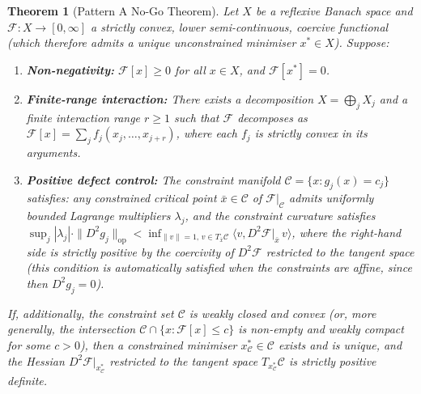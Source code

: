 \documentclass[12pt,a4paper]{article}
\newtheorem{theorem}{Theorem}[section]
\theoremstyle{definition}
\theoremstyle{remark}
\begin{document}
\begin{theorem}[Pattern A No-Go Theorem]\label{thm:no-go}
Let $X$ be a reflexive Banach space and $\mathcal{F} \colon X \to [0,\infty]$ a strictly convex, lower semi-continuous, coercive functional \textup{(}which therefore admits a unique unconstrained minimiser $x^* \in X$\textup{)}. Suppose:
\begin{enumerate}[label=\textup{(\roman*)}]
  \item \textbf{Non-negativity:}
    $\mathcal{F}[x] \ge 0$ for all $x \in X$, and $\mathcal{F}[x^*] = 0$.
  \item \textbf{Finite-range interaction:} There exists a decomposition
    $X = \bigoplus_{j} X_j$ and a finite interaction range $r \ge 1$ such that $\mathcal{F}$ decomposes as
    $\mathcal{F}[x] = \sum_j f_j(x_j, \ldots, x_{j+r})$, where each $f_j$ is strictly convex in its arguments.
  \item \textbf{Positive defect control:} The constraint manifold
    $\mathcal{C} = \{x : g_j(x) = c_j\}$ satisfies:
    any constrained critical point $\bar{x} \in \mathcal{C}$ of $\mathcal{F}|_{\mathcal{C}}$ admits
    uniformly bounded Lagrange multipliers $\lambda_j$,
    and the constraint curvature satisfies
    $\sup_j |\lambda_j| \cdot \|D^2 g_j\|_{\mathrm{op}} < \inf_{\|v\|=1,\, v \in T_{\bar{x}}\mathcal{C}} \langle v, D^2\mathcal{F}|_{\bar{x}}\, v\rangle$,
    where the right-hand side is strictly positive by the coercivity of $D^2\mathcal{F}$ restricted to the tangent space
    \textup{(}this condition is automatically satisfied when the
    constraints are affine, since then $D^2 g_j = 0$\textup{)}.
\end{enumerate}
If, additionally, the constraint set $\mathcal{C}$ is weakly closed and convex \textup{(}or, more generally,
the intersection $\mathcal{C} \cap \{x : \mathcal{F}[x] \le c\}$ is non-empty and weakly compact for some
$c > 0$\textup{)}, then a constrained minimiser $x^*_{\mathcal{C}} \in \mathcal{C}$ exists and is unique, and the Hessian
$D^2\mathcal{F}|_{x^*_{\mathcal{C}}}$ restricted to the tangent space $T_{x^*_{\mathcal{C}}}\mathcal{C}$
is strictly positive definite.
\end{theorem}
\end{document}
